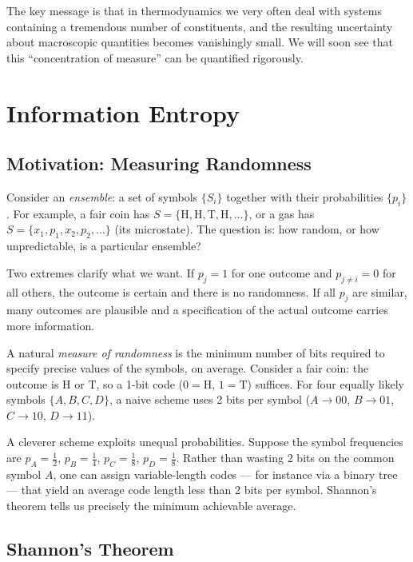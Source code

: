 The key message is that in thermodynamics we very often deal with systems containing a tremendous number of constituents, and the resulting uncertainty about macroscopic quantities becomes vanishingly small. We will soon see that this ``concentration of measure'' can be quantified rigorously.

\chapter{Information Entropy}

\section{Motivation: Measuring Randomness}

Consider an \emph{ensemble}: a set of symbols $\{S_i\}$ together with their probabilities $\{p_i\}$. For example, a fair coin has $S = \{\text{H}, \text{H}, \text{T}, \text{H}, \ldots\}$, or a gas has $S = \{x_1, p_1, x_2, p_2, \ldots\}$ (its microstate). The question is: how random, or how unpredictable, is a particular ensemble?

Two extremes clarify what we want. If $p_j = 1$ for one outcome and $p_{j\neq i} = 0$ for all others, the outcome is certain and there is no randomness. If all $p_j$ are similar, many outcomes are plausible and a specification of the actual outcome carries more information.

A natural \emph{measure of randomness} is the minimum number of bits required to specify precise values of the symbols, on average. Consider a fair coin: the outcome is $\mathrm{H}$ or $\mathrm{T}$, so a 1-bit code ($0 = \mathrm{H}$, $1 = \mathrm{T}$) suffices. For four equally likely symbols $\{A, B, C, D\}$, a naive scheme uses 2 bits per symbol ($A\to 00$, $B\to 01$, $C\to 10$, $D\to 11$).

A cleverer scheme exploits unequal probabilities. Suppose the symbol frequencies are $p_A = \tfrac{1}{2}$, $p_B = \tfrac{1}{4}$, $p_C = \tfrac{1}{8}$, $p_D = \tfrac{1}{8}$. Rather than wasting 2 bits on the common symbol $A$, one can assign variable-length codes — for instance via a binary tree — that yield an average code length less than 2 bits per symbol. Shannon's theorem tells us precisely the minimum achievable average.

\section{Shannon's Theorem}

